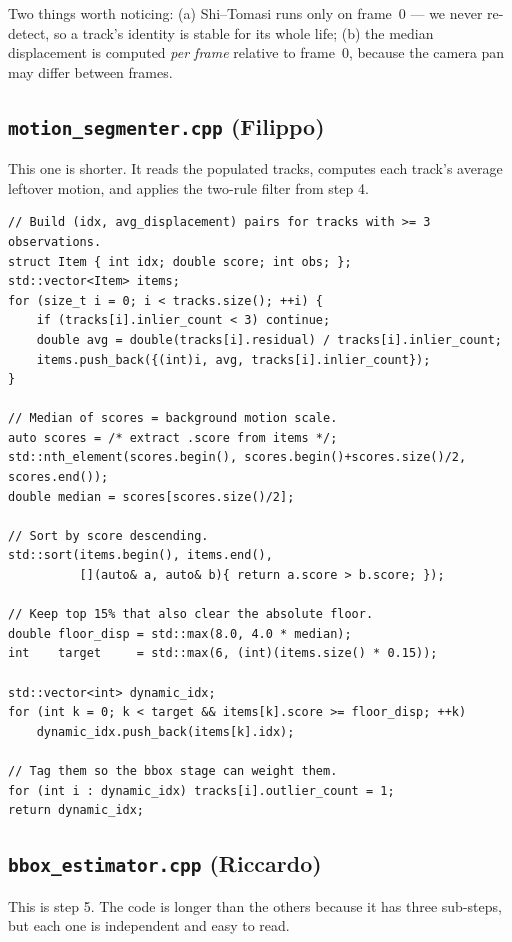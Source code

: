 \documentclass[11pt,a4paper]{article}
\begin{document}
Two things worth noticing: (a) Shi--Tomasi runs only on frame~0 ---
we never re-detect, so a track's identity is stable for its whole
life; (b) the median displacement is computed \emph{per frame}
relative to frame~0, because the camera pan may differ between
frames.

\subsection{\texttt{motion\_segmenter.cpp} (Filippo)}

This one is shorter. It reads the populated tracks, computes each
track's average leftover motion, and applies the two-rule filter
from step 4.

\begin{lstlisting}[caption={Core of \texttt{classifyDynamicTracks}.}]
// Build (idx, avg_displacement) pairs for tracks with >= 3 observations.
struct Item { int idx; double score; int obs; };
std::vector<Item> items;
for (size_t i = 0; i < tracks.size(); ++i) {
    if (tracks[i].inlier_count < 3) continue;
    double avg = double(tracks[i].residual) / tracks[i].inlier_count;
    items.push_back({(int)i, avg, tracks[i].inlier_count});
}

// Median of scores = background motion scale.
auto scores = /* extract .score from items */;
std::nth_element(scores.begin(), scores.begin()+scores.size()/2, scores.end());
double median = scores[scores.size()/2];

// Sort by score descending.
std::sort(items.begin(), items.end(),
          [](auto& a, auto& b){ return a.score > b.score; });

// Keep top 15% that also clear the absolute floor.
double floor_disp = std::max(8.0, 4.0 * median);
int    target     = std::max(6, (int)(items.size() * 0.15));

std::vector<int> dynamic_idx;
for (int k = 0; k < target && items[k].score >= floor_disp; ++k)
    dynamic_idx.push_back(items[k].idx);

// Tag them so the bbox stage can weight them.
for (int i : dynamic_idx) tracks[i].outlier_count = 1;
return dynamic_idx;
\end{lstlisting}

\subsection{\texttt{bbox\_estimator.cpp} (Riccardo)}

This is step 5. The code is longer than the others because it has
three sub-steps, but each one is independent and easy to read.
\end{document}
